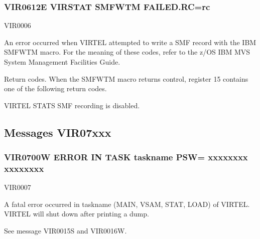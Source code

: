 \documentclass[letterpaper,10pt,english]{sphinxmanual}
\begin{document}
\subsubsection{VIR0612E VIRSTAT SMFWTM FAILED.RC=rc}
\label{\detokenize{messages:vir0612e-virstat-smfwtm-failed-rc-rc}}\begin{description}
\sphinxAtStartPar
VIR0006

\sphinxAtStartPar
An error occurred when VIRTEL attempted to write a SMF record with the IBM SMFWTM macro. For the meaning of these codes, refer to the z/OS IBM MVS System Management Facilities Guide.

\sphinxAtStartPar
Return codes.
When the SMFWTM macro returns control, register 15 contains one of the following return codes.

\begin{sphinxVerbatim}[commandchars=\\\{\}]
  
                 
\end{sphinxVerbatim}

\sphinxAtStartPar
VIRTEL STATS SMF recording is disabled.

\end{description}


\subsection{Messages VIR07xxx}
\label{\detokenize{messages:messages-vir07xxx}}

\subsubsection{VIR0700W ERROR IN TASK taskname PSW= xxxxxxxx xxxxxxxx}
\label{\detokenize{messages:vir0700w-error-in-task-taskname-psw-xxxxxxxx-xxxxxxxx}}\begin{description}
\sphinxAtStartPar
VIR0007

\sphinxAtStartPar
A fatal error occurred in taskname (MAIN, VSAM, STAT, LOAD) of VIRTEL. VIRTEL will shut down after printing a dump.

\sphinxAtStartPar
See message VIR0015S and VIR0016W.

\end{description}
\end{document}
